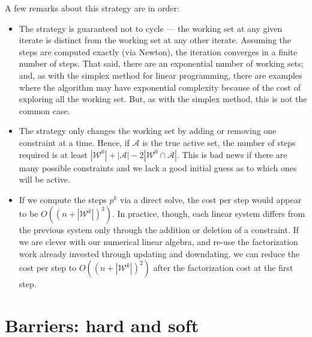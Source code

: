 \documentclass[12pt, leqno]{article} %
\begin{document}
A few remarks about this strategy are in order:
\begin{itemize}
\item
  The strategy is guaranteed not to cycle --- the working set at any
  given iterate is distinct from the working set at any other iterate.
  Assuming the steps are computed exactly (via Newton), the iteration
  converges in a finite number of steps.
  That said, there are an exponential number of working sets; and, as
  with the simplex method for linear programming, there are examples
  where the algorithm may have exponential complexity because of the
  cost of exploring all the working set.  But, as with the simplex
  method, this is not the common case.
\item
  The strategy only changes the working set by adding or removing
  one constraint at a time.  Hence, if $\mathcal{A}$ is the true
  active set, the number of steps required is at least
  $|\mathcal{W}^0| + |\mathcal{A}| - 2|\mathcal{W}^0 \cap \mathcal{A}|$.
  This is bad news if there are many possible constraints and we lack
  a good initial guess as to which ones will be active.
\item
  If we compute the steps $p^k$ via a direct solve, the cost per step
  would appear to be $O((n+|\mathcal{W}^k|)^3)$.  In practice, though,
  each linear system differs from the previous system only through the
  addition or deletion of a constraint.  If we are clever with our
  numerical linear algebra, and re-use the factorization work already
  invested through updating and downdating, we can reduce the cost per
  step to $O((n+|\mathcal{W}^k|)^2)$ after the factorization cost at
  the first step.
\end{itemize}

\section{Barriers: hard and soft}
\end{document}
